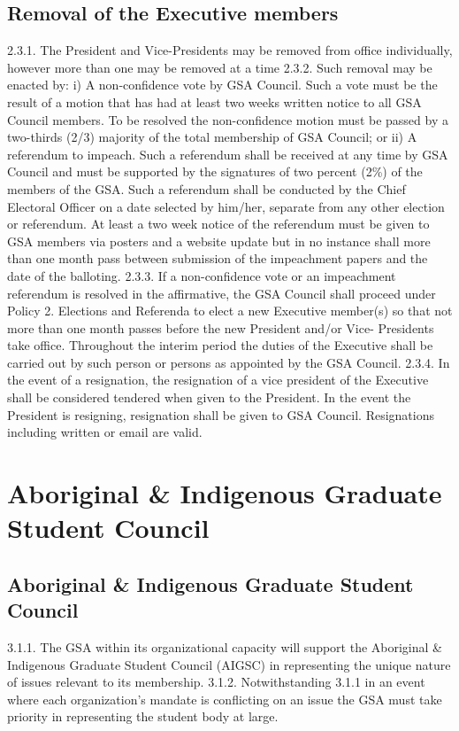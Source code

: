 \subsection{Removal of the Executive members }
2.3.1. The President and Vice-Presidents may be removed from office 
individually, however more than one may be removed at a time 
2.3.2. Such removal may be enacted by: 
i) A non-confidence vote by GSA Council. Such a vote must be the 
result of a motion that has had at least two weeks written notice to all GSA Council members. To be resolved the non-confidence motion 
must be passed by a two-thirds (2/3) majority of the total membership 
of GSA Council; or 
ii) A referendum to impeach. Such a referendum shall be received at any 
time by GSA Council and must be supported by the signatures of two 
percent (2\%) of the members of the GSA. Such a referendum shall be 
conducted by the Chief Electoral Officer on a date selected by him/her, 
separate from any other election or referendum. At least a two week 
notice of the referendum must be given to GSA members via posters 
and a website update but in no instance shall more than one month 
pass between submission of the impeachment papers and the date of 
the balloting. 
2.3.3. If a non-confidence vote or an impeachment referendum is resolved in 
the affirmative, the GSA Council shall proceed under Policy 2. 
Elections and Referenda to elect a new Executive member(s) so that 
not more than one month passes before the new President and/or Vice- 
Presidents take office. Throughout the interim period the duties of the 
Executive shall be carried out by such person or persons as appointed 
by the GSA Council. 
2.3.4. In the event of a resignation, the resignation of a vice president of the 
Executive shall be considered tendered when given to the President. In 
the event the President is resigning, resignation shall be given to GSA 
Council. Resignations including written or email are valid. 
\section{ Aboriginal \& Indigenous Graduate Student Council }
\subsection{Aboriginal \& Indigenous Graduate Student Council }
3.1.1. The GSA within its organizational capacity will support the Aboriginal 
\& Indigenous Graduate Student Council (AIGSC) in representing the 
unique nature of issues relevant to its membership. 
3.1.2. Notwithstanding 3.1.1 in an event where each organization’s mandate 
is conflicting on an issue the GSA must take priority in representing 
the student body at large. 
